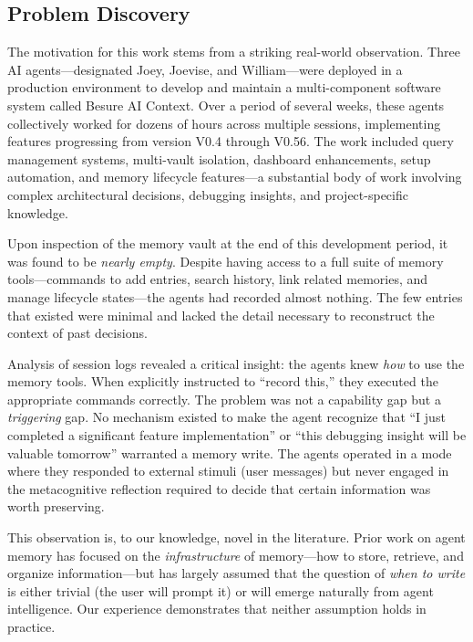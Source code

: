 \documentclass[11pt]{article}
\begin{document}
\subsection{Problem Discovery}

The motivation for this work stems from a striking real-world observation. Three AI agents---designated Joey, Joevise, and William---were deployed in a production environment to develop and maintain a multi-component software system called Besure AI Context. Over a period of several weeks, these agents collectively worked for dozens of hours across multiple sessions, implementing features progressing from version V0.4 through V0.56. The work included query management systems, multi-vault isolation, dashboard enhancements, setup automation, and memory lifecycle features---a substantial body of work involving complex architectural decisions, debugging insights, and project-specific knowledge.

Upon inspection of the memory vault at the end of this development period, it was found to be \emph{nearly empty}. Despite having access to a full suite of memory tools---commands to add entries, search history, link related memories, and manage lifecycle states---the agents had recorded almost nothing. The few entries that existed were minimal and lacked the detail necessary to reconstruct the context of past decisions.

Analysis of session logs revealed a critical insight: the agents knew \emph{how} to use the memory tools. When explicitly instructed to ``record this,'' they executed the appropriate commands correctly. The problem was not a capability gap but a \emph{triggering} gap. No mechanism existed to make the agent recognize that ``I just completed a significant feature implementation'' or ``this debugging insight will be valuable tomorrow'' warranted a memory write. The agents operated in a mode where they responded to external stimuli (user messages) but never engaged in the metacognitive reflection required to decide that certain information was worth preserving.

This observation is, to our knowledge, novel in the literature. Prior work on agent memory has focused on the \emph{infrastructure} of memory---how to store, retrieve, and organize information---but has largely assumed that the question of \emph{when to write} is either trivial (the user will prompt it) or will emerge naturally from agent intelligence. Our experience demonstrates that neither assumption holds in practice.
\end{document}
